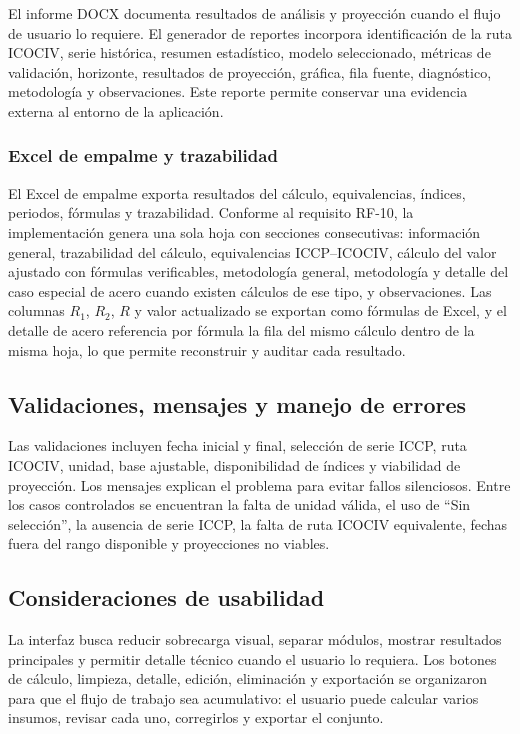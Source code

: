 \documentclass[12pt,letterpaper]{article}
\newcommand{\ICOCIV}{ICOCIV}
\newcommand{\ICCP}{ICCP}
\begin{document}
El informe DOCX documenta resultados de análisis y proyección cuando el flujo de usuario lo requiere. El generador de reportes incorpora identificación de la ruta \ICOCIV, serie histórica, resumen estadístico, modelo seleccionado, métricas de validación, horizonte, resultados de proyección, gráfica, fila fuente, diagnóstico, metodología y observaciones. Este reporte permite conservar una evidencia externa al entorno de la aplicación.

\subsubsection{Excel de empalme y trazabilidad}

El Excel de empalme exporta resultados del cálculo, equivalencias, índices, periodos, fórmulas y trazabilidad. Conforme al requisito RF-10, la implementación genera una sola hoja con secciones consecutivas: información general, trazabilidad del cálculo, equivalencias \ICCP--\ICOCIV, cálculo del valor ajustado con fórmulas verificables, metodología general, metodología y detalle del caso especial de acero cuando existen cálculos de ese tipo, y observaciones. Las columnas \(R_1\), \(R_2\), \(R\) y valor actualizado se exportan como fórmulas de Excel, y el detalle de acero referencia por fórmula la fila del mismo cálculo dentro de la misma hoja, lo que permite reconstruir y auditar cada resultado.

\subsection{Validaciones, mensajes y manejo de errores}

Las validaciones incluyen fecha inicial y final, selección de serie \ICCP, ruta \ICOCIV, unidad, base ajustable, disponibilidad de índices y viabilidad de proyección. Los mensajes explican el problema para evitar fallos silenciosos. Entre los casos controlados se encuentran la falta de unidad válida, el uso de ``Sin selección'', la ausencia de serie \ICCP, la falta de ruta \ICOCIV{} equivalente, fechas fuera del rango disponible y proyecciones no viables.

\subsection{Consideraciones de usabilidad}

La interfaz busca reducir sobrecarga visual, separar módulos, mostrar resultados principales y permitir detalle técnico cuando el usuario lo requiera. Los botones de cálculo, limpieza, detalle, edición, eliminación y exportación se organizaron para que el flujo de trabajo sea acumulativo: el usuario puede calcular varios insumos, revisar cada uno, corregirlos y exportar el conjunto.
\end{document}
